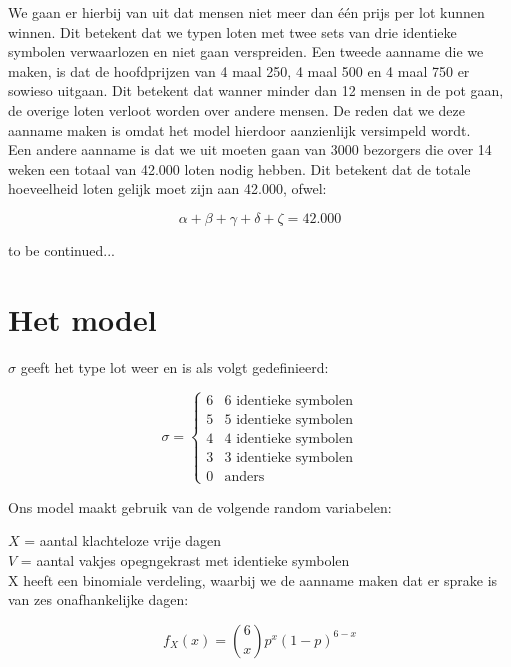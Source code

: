 \documentclass[a4paper, oneside, book]{memoir}
\begin{document}
We gaan er hierbij van uit dat mensen niet meer dan één prijs per lot kunnen winnen. Dit betekent dat we typen loten met twee sets van drie identieke symbolen verwaarlozen en niet gaan verspreiden. Een tweede aanname die we maken, is dat de hoofdprijzen van 4 maal 250, 4 maal 500 en 4 maal 750 er sowieso uitgaan. Dit betekent dat wanner minder dan 12 mensen in de pot gaan, de overige loten verloot worden over andere mensen. De reden dat we deze aanname maken is omdat het model hierdoor aanzienlijk versimpeld wordt.\\

Een andere aanname is dat we uit moeten gaan van 3000 bezorgers die over 14 weken een totaal van 42.000 loten nodig hebben. Dit betekent dat de totale hoeveelheid loten gelijk moet zijn aan 42.000, ofwel:

\begin{equation}
    \alpha+\beta+\gamma+\delta+\zeta=42.000
\end{equation}

to be continued...

\chapter*{Het model}

$\sigma$ geeft het type lot weer en is als volgt gedefinieerd:

\begin{equation}
  \sigma =
  \begin{cases}
     6  &   6 \mbox{ identieke symbolen}\\
     5  &   5 \mbox{ identieke symbolen}\\
     4  &   4 \mbox{ identieke symbolen}\\
     3  &   3 \mbox{ identieke symbolen}\\
     0  &   \mbox{anders}
  \end{cases}
\end{equation}

Ons model maakt gebruik van de volgende random variabelen:

$X$ = aantal klachteloze vrije dagen\\
$V$ = aantal vakjes opegngekrast met identieke symbolen\\

X heeft een binomiale verdeling, waarbij we de aanname maken dat er sprake is van zes onafhankelijke dagen:

\begin{equation}
f_{X}(x)=\binom{6}{x} p^{x}(1-p)^{6-x}
\end{equation}
\end{document}
